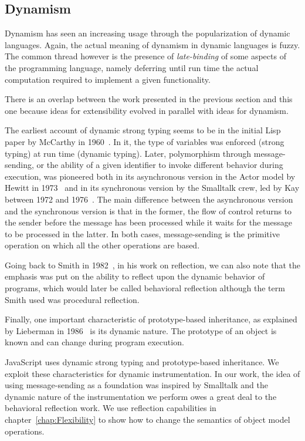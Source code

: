 \subsection{Dynamism}

Dynamism has seen an increasing usage through the popularization of dynamic
languages. Again, the actual meaning of dynamism in dynamic languages is
fuzzy. The common thread however is the presence of \textit{late-binding} of
some aspects of the programming language, namely deferring until run time the
actual computation required to implement a given functionality.

There is an overlap between the work presented in the previous section and this
one because ideas for extensibility evolved in parallel with ideas for
dynamism.

The earliest account of dynamic strong typing seems to be in the initial Lisp
paper by McCarthy in 1960~\cite{McCarthy:1960}. In it, the type of variables
was enforced (strong typing) at run time (dynamic typing). Later, polymorphism
through message-sending, or the ability of a given identifier to invoke
different behavior during execution, was pioneered both in its asynchronous
version in the Actor model by Hewitt in 1973~\cite{Hewitt:1973} and in its
synchronous version by the Smalltalk crew, led by Kay between 1972 and
1976~\cite{Kay:1993}. The main difference between the asynchronous version and
the synchronous version is that in the former, the flow of control returns to
the sender before the message has been processed while it waits for the message
to be processed in the latter. In both cases, message-sending is the primitive
operation on which all the other operations are based.

Going back to Smith in 1982~\cite{Smith:1982}, in his work on reflection, we
can also note that the emphasis was put on the ability to reflect upon the
dynamic behavior of programs, which would later be called behavioral reflection
although the term Smith used was procedural reflection.

Finally, one important characteristic of prototype-based inheritance, as
explained by Lieberman in 1986~\cite{Lieberman:1986} is its dynamic nature. The
prototype of an object is known and can change during program execution.

JavaScript uses dynamic strong typing and prototype-based inheritance.  We
exploit these characteristics for dynamic instrumentation. In our work, the
idea of using message-sending as a foundation was inspired by Smalltalk  and
the dynamic nature of the instrumentation we perform owes a great deal to the
behavioral reflection work. We use reflection capabilities in
chapter~\ref{chap:Flexibility} to show how to change the semantics of object
model operations.

